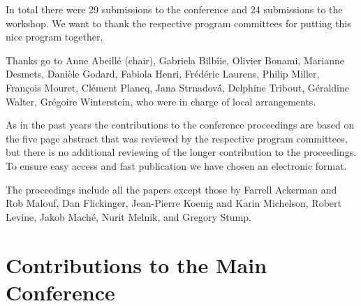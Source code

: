\documentclass[11pt,a4paper,fleqn]{article}
\begin{document}
In total there were 29  submissions to the conference and 24 submissions to the workshop.
We want to thank the respective program committees for putting this nice program together.



Thanks go to Anne Abeillé (chair), Gabriela Bilbîie, Olivier Bonami, Marianne Desmets, Danièle Godard,
Fabiola Henri,
Frédéric Laurens,
Philip Miller,
François Mouret,
Clément Plancq,
Jana Strnadová,
Delphine Tribout,
Géraldine Walter,
Grégoire Winterstein, who were in charge of local arrangements.


As in the past years the contributions to the conference proceedings are based on the five page abstract
that was reviewed by the respective program committees, but there is no additional reviewing of the
longer contribution to the proceedings.
To ensure easy access and fast publication we have chosen an electronic format.


The proceedings include all the papers except those by Farrell Ackerman and Rob Malouf, Dan Flickinger, Jean-Pierre Koenig and Karin
Michelson, Robert Levine, Jakob Maché, Nurit Melnik, and Gregory Stump.


\newpage
\part{Contributions to the Main Conference}
\thispagestyle{empty}
\newpage
        \setcounter{page}{6}
\thispagestyle{empty}
\end{document}
